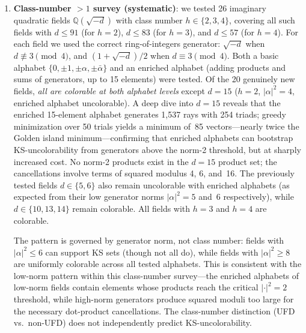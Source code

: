 \documentclass[12pt,a4paper]{article}
\newcommand{\Q}{\mathbb{Q}}
\begin{document}
\begin{enumerate}
    Its cancellation identity is the minimal polynomial itself, $\psi^3 - \psi^2 - 1 = 0$, and unlike the golden and $\Q(\sqrt[3]{2})$ islands it cannot be routed through indirect modulus-2: the value~2 occurs neither among its coordinates nor among its pairwise coordinate products, and no additive $1 + 1 - 2 = 0$ cancellation occurs anywhere in the critical set.  We therefore record this as a third mechanism, \emph{minimal-polynomial cancellation}, in which the defining relation of a cubic algebraic unit supplies the vanishing three-term sum directly.  Note that $|\psi|^2 \approx 2.148$ lies in the interval $(2,3)$, so the island is consistent with the observation that generators of squared modulus ${\geq}\,3$ produce no KS sets.  Multi-generator alphabets with simultaneous conjugate cancellations remain largely untested.
    \item \label{item:class-number-survey}\textbf{Class-number $> 1$ survey (systematic)}: we tested 26 imaginary quadratic fields $\Q(\sqrt{-d})$ with class number $h \in \{2, 3, 4\}$, covering all such fields with $d \leq 91$ (for $h = 2$), $d \leq 83$ (for $h = 3$), and $d \leq 57$ (for $h = 4$). For each field we used the correct ring-of-integers generator: $\sqrt{-d}$ when $d \not\equiv 3 \pmod{4}$, and $(1 + \sqrt{-d})/2$ when $d \equiv 3 \pmod{4}$. Both a basic alphabet $\{0, \pm 1, \pm\alpha, \pm\bar\alpha\}$ and an enriched alphabet (adding products and sums of generators, up to 15 elements) were tested. Of the 20 genuinely new fields, \emph{all are colorable at both alphabet levels} except $d = 15$ ($h = 2$, $|\alpha|^2 = 4$, enriched alphabet uncolorable).  A deep dive into $d = 15$ reveals that the enriched 15-element alphabet generates 1{,}537 rays with 254 triads; greedy minimization over 50 trials yields a minimum of~85 vectors---nearly twice the Golden island minimum---confirming that enriched alphabets can bootstrap KS-uncolorability from generators above the norm-2 threshold, but at sharply increased cost.  No norm-2 products exist in the $d = 15$ product set; the cancellations involve terms of squared modulus 4, 6, and~16. The previously tested fields $d \in \{5, 6\}$ also remain uncolorable with enriched alphabets (as expected from their low generator norms $|\alpha|^2 = 5$ and~6 respectively), while $d \in \{10, 13, 14\}$ remain colorable. All fields with $h = 3$ and $h = 4$ are colorable.

    The pattern is governed by generator norm, not class number: fields with $|\alpha|^2 \leq 6$ can support KS sets (though not all do), while fields with $|\alpha|^2 \geq 8$ are uniformly colorable across all tested alphabets. This is consistent with the low-norm pattern within this class-number survey---the enriched alphabets of low-norm fields contain elements whose products reach the critical $|\cdot|^2 = 2$ threshold, while high-norm generators produce squared moduli too large for the necessary dot-product cancellations. The class-number distinction (UFD vs.\ non-UFD) does not independently predict KS-uncolorability.


\end{enumerate}
\end{document}
